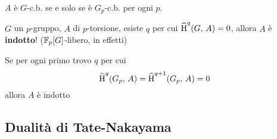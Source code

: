 \documentclass[a4paper]{article}
\begin{document}
	\begin{lemma}
		$ A $ è $ G$-c.b. se e solo se è $ G_p$-c.b. per ogni $ p. $
	\end{lemma}

	\begin{theorem}
		$ G $ un $ p $-gruppo, $ A $ di $ p $-torsione, esiste $ q $ per cui $ \operatorname{\widehat{H}}^q(G, \, A) = 0 $, allora $ A $ è \textbf{indotto}! ($ \mathbb{F}_p[G] $-libero, in effetti)
	\end{theorem}

	\begin{theorem}
		Se per ogni primo trovo $ q $ per cui $$  \operatorname{\widehat{H}} ^q(G_p,\, A) = \operatorname{\widehat{H}}^{q+1}(G_p,\, A) = 0  $$ allora $ A $ è indotto
	\end{theorem}

	\subsection{Dualità di Tate-Nakayama}
	
\end{document}
